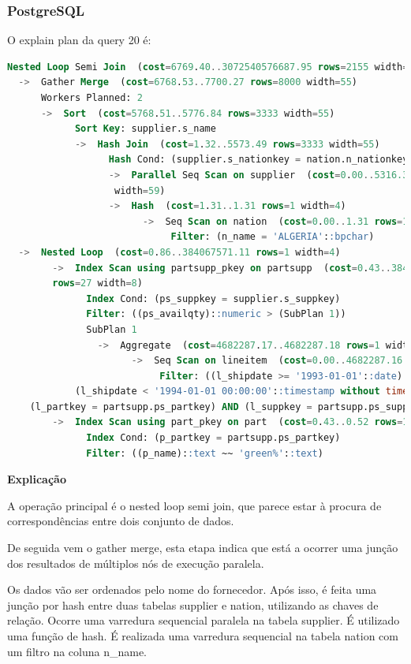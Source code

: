 \documentclass{article}
\begin{document}
\subsubsection{PostgreSQL}
O explain plan da query 20 é:\\
\begin{lstlisting}[language=SQL]
Nested Loop Semi Join  (cost=6769.40..3072540576687.95 rows=2155 width=51)
  ->  Gather Merge  (cost=6768.53..7700.27 rows=8000 width=55)
      Workers Planned: 2
      ->  Sort  (cost=5768.51..5776.84 rows=3333 width=55)
            Sort Key: supplier.s_name
            ->  Hash Join  (cost=1.32..5573.49 rows=3333 width=55)
                  Hash Cond: (supplier.s_nationkey = nation.n_nationkey)
                  ->  Parallel Seq Scan on supplier  (cost=0.00..5316.33 rows=83333
                   width=59)
                  ->  Hash  (cost=1.31..1.31 rows=1 width=4)
                        ->  Seq Scan on nation  (cost=0.00..1.31 rows=1 width=4)
                             Filter: (n_name = 'ALGERIA'::bpchar)
  ->  Nested Loop  (cost=0.86..384067571.11 rows=1 width=4)
        ->  Index Scan using partsupp_pkey on partsupp  (cost=0.43..384067557.06 
        rows=27 width=8)
              Index Cond: (ps_suppkey = supplier.s_suppkey)
              Filter: ((ps_availqty)::numeric > (SubPlan 1))
              SubPlan 1
                ->  Aggregate  (cost=4682287.17..4682287.18 rows=1 width=32)
                      ->  Seq Scan on lineitem  (cost=0.00..4682287.16 rows=1 width=5)
                           Filter: ((l_shipdate >= '1993-01-01'::date) AND 
            (l_shipdate < '1994-01-01 00:00:00'::timestamp without time zone) AND 
    (l_partkey = partsupp.ps_partkey) AND (l_suppkey = partsupp.ps_suppkey))
        ->  Index Scan using part_pkey on part  (cost=0.43..0.52 rows=1 width=4)
              Index Cond: (p_partkey = partsupp.ps_partkey)
              Filter: ((p_name)::text ~~ 'green%'::text)
  \end{lstlisting}

  \textbf{Explicação}

  \texttt{}\par A operação principal é o nested loop semi join, que parece estar à procura de correspondências entre dois conjunto de dados.

  De seguida vem o gather merge, esta etapa indica que está a ocorrer uma junção dos resultados de múltiplos nós de execução paralela.

  Os dados vão ser ordenados pelo nome do fornecedor. Após isso, é feita uma junção por hash entre duas tabelas supplier e nation, utilizando as chaves de relação. Ocorre uma varredura sequencial paralela na tabela supplier. É utilizado uma função de hash. É realizada uma varredura sequencial na tabela nation com um filtro na coluna n\_name.
\end{document}
